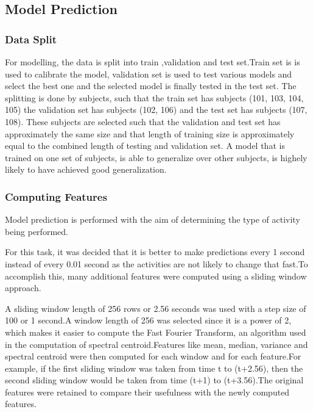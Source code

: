\documentclass[11pt]{article}
\begin{document}
    \hypertarget{model-prediction}{%
\subsection{\texorpdfstring{Model
Prediction}{Model Prediction }}\label{model-prediction}}

\hypertarget{data-split}{%
\subsubsection{Data Split}\label{data-split}}

For modelling, the data is split into train ,validation and test
set.Train set is is used to calibrate the model, validation set is used
to test various models and select the best one and the selected model is
finally tested in the test set. The splitting is done by subjects, such
that the train set has subjects (101, 103, 104, 105) the validation set
has subjects (102, 106) and the test set has subjects (107, 108). These
subjects are selected such that the validation and test set has
approximately the same size and that length of training size is
approximately equal to the combined length of testing and validation
set. A model that is trained on one set of subjects, is able to
generalize over other subjects, is highely likely to have achieved good
generalization.

\hypertarget{computing-features}{%
\subsubsection{Computing Features}\label{computing-features}}

Model prediction is performed with the aim of determining the type of
activity being performed.

For this task, it was decided that it is better to make predictions
every 1 second instead of every 0.01 second as the activities are not
likely to change that fast.To accomplish this, many additional features
were computed using a sliding window approach.

A sliding window length of 256 rows or 2.56 seconds was used with a step
size of 100 or 1 second.A window length of 256 was selected since it is
a power of 2, which makes it easier to compute the Fast Fourier
Transform, an algorithm used in the computation of spectral
centroid.Features like mean, median, variance and spectral centroid were
then computed for each window and for each feature.For example, if the
first sliding window was taken from time t to (t+2.56), then the second
sliding window would be taken from time (t+1) to (t+3.56).The original
features were retained to compare their usefulness with the newly
computed features.
\end{document}
